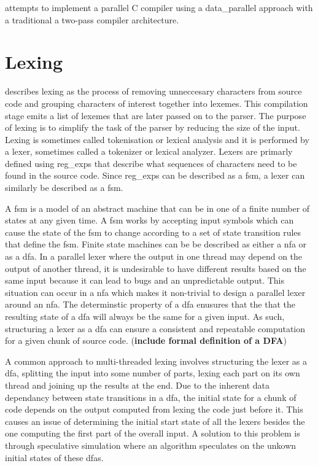 \cite{mark_thierry_vandevoorde_parallel_1988} attempts to implement a parallel
C compiler using a \gls{data_parallel} approach with a traditional a two-pass
compiler architecture.

\section{Lexing} \label{lit_review_lexing}

\cite{scott_programming_2015} describes lexing as the process of removing
unneccesary characters from source code and grouping characters of interest
together into lexemes. This compilation stage emits a list of lexemes that are
later passed on to the parser. The purpose of lexing is to simplify the task
of the parser by reducing the size of the input. Lexing is sometimes  called
tokenisation or lexical analysis and it is performed by a lexer, sometimes
called a tokenizer or lexical analyzer. Lexers are primarly defined using
\glspl{reg_exp} that describe what sequences of characters need to be found in
the source code. Since \glspl{reg_exp} can be described as a \gls{fsm}, a lexer
can similarly be described as a \gls{fsm}.

A \gls{fsm} is a model of an abstract machine that can be in one of a finite
number of states at any given time. A \gls{fsm} works by accepting input symbols
which can cause the state of the \gls{fsm} to change according to a set of
state transition rules that define the \gls{fsm}. Finite state machines can
be be described as either a \gls{nfa} or as a \gls{dfa}. In a parallel lexer
where the output in one thread may depend on the output of another thread,
it is undesirable to have different results based on the same input because
it can lead to bugs and an unpredictable output. This situation can occur in
a \gls{nfa} which makes it non-trivial to design a parallel lexer around an
\gls{nfa}. The determinstic property of a \gls{dfa} enusures that the that the
resulting state of a \gls{dfa} will always be the same for a given input.  As
such, structuring a lexer as a \gls{dfa} can ensure a consistent and repeatable
computation for a given chunk of source code. (\textbf{include formal definition
of a DFA})

A common approach to multi-threaded lexing involves structuring the lexer as a
\gls{dfa}, splitting the input into some number of parts, lexing each part on
its own thread and joining up the results at the end. Due to the inherent data
dependancy between state transitions in a \gls{dfa}, the initial state for a
chunk of code depends on the output computed from lexing the code just before
it. This causes an issue of determining the initial start state of all the
lexers besides the one computing the first part of the overall input. A solution
to this problem is through speculative simulation where an algorithm speculates
on the unkown initial states of these \gls{dfa}s.

